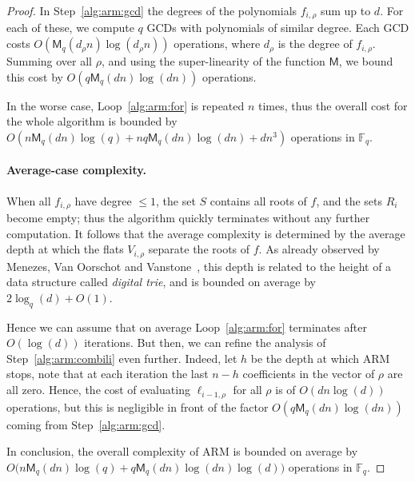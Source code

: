 \documentclass{article}
\newcommand{\ff}[1]{\mathbb{F}_{#1}}
\newcommand{\qq}{q}
\newcommand{\basef}{\ff{\qq}}
\newcommand{\Mul}{\mathsf{M}}
\newcounter{algo}
\begin{document}
\begin{proof}
  In Step~\ref{alg:arm:gcd} the degrees of the polynomials
  $f_{i,\rho}$ sum up to $d$. %
  For each of these, we compute $q$ GCDs with polynomials of similar
  degree. %
  Each GCD costs $O(\Mul_q(d_\rho n)\log(d_\rho n))$ operations, where
  $d_\rho$ is the degree of $f_{i,\rho}$. %
  Summing over all $\rho$, and using the super-linearity of the
  function $\Mul$, we bound this cost by $O(q\Mul_q(dn)\log(dn))$
  operations.

  In the worse case, Loop~\ref{alg:arm:for} is repeated $n$ times,
  thus the overall cost for the whole algorithm is bounded by
  $O(n\Mul_q(dn)\log(q) + nq\Mul_q(dn)\log(dn) + dn^3)$ operations in
  $\basef$.

  \paragraph{Average-case complexity.} When all $f_{i,\rho}$ have
  degree $\le 1$, the set $S$ contains all roots of $f$, and the sets
  $R_i$ become empty; thus the algorithm quickly terminates without
  any further computation. %
  It follows that the average complexity is determined by the average
  depth at which the flats $V_{i,\rho}$ separate the roots of $f$. %
  As already observed by Menezes, Van Oorschot and
  Vanstone~\cite[Theorem~7]{Menvanovans92}, this depth is related to
  the height of a data structure called \emph{digital trie}, and is
  bounded on average by $2\log_q(d) + O(1)$.

  Hence we can assume that on average Loop~\ref{alg:arm:for}
  terminates after $O(\log(d))$ iterations. %
  But then, we can refine the analysis of Step~\ref{alg:arm:combili}
  even further. %
  Indeed, let $h$ be the depth at which ARM stops, note that at each
  iteration the last $n-h$ coefficients in the vector of $\rho$ are
  all zero. %
  Hence, the cost of evaluating $\ell_{i-1,\rho}$ for all $\rho$ is of
  $O(dn\log(d))$ operations, but this is negligible in front of the
  factor $O(q\Mul_q(dn)\log(dn))$ coming from Step~\ref{alg:arm:gcd}.

  In conclusion, the overall complexity of ARM is bounded on average
  by $O\bigl(n\Mul_q(dn)\log(q) + q\Mul_q(dn)\log(dn)\log(d)\bigr)$
  operations in $\basef$.
\end{proof}
\end{document}
